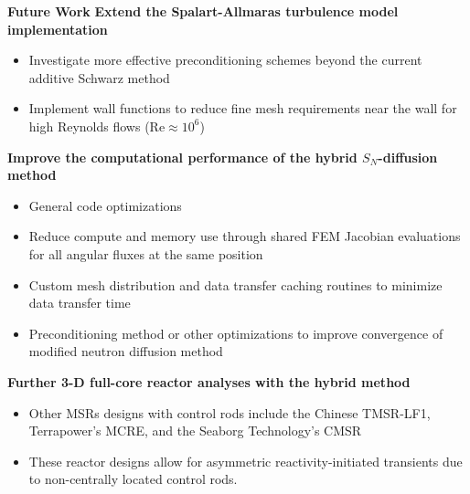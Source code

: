 \begin{frame}
  \begin{block}{\textbf{Future Work}}
    \textbf{Extend the Spalart-Allmaras turbulence model implementation}
      \begin{itemize}
        \item Investigate more effective preconditioning schemes beyond the
          current additive Schwarz method
        \item Implement wall functions to reduce fine mesh requirements near the wall for high
          Reynolds flows (Re$\approx 10^6$)
      \end{itemize}
    \textbf{Improve the computational performance of the hybrid $S_N$-diffusion method}
      \begin{itemize}
        \item General code optimizations
        \item Reduce compute and memory use through shared FEM Jacobian evaluations for all angular
          fluxes at the same position
        \item Custom mesh distribution and data transfer caching routines to minimize data transfer time
        \item Preconditioning method or other optimizations to improve convergence of modified neutron diffusion
          method
      \end{itemize}
    \textbf{Further 3-D full-core reactor analyses with the hybrid method}
      \begin{itemize}
        \item Other MSRs designs with control rods include the Chinese TMSR-LF1,
          Terrapower's MCRE, and the Seaborg Technology's CMSR
        \item These reactor designs allow for asymmetric reactivity-initiated transients due to
          non-centrally located control rods.
      \end{itemize}
  \end{block}
\end{frame}

